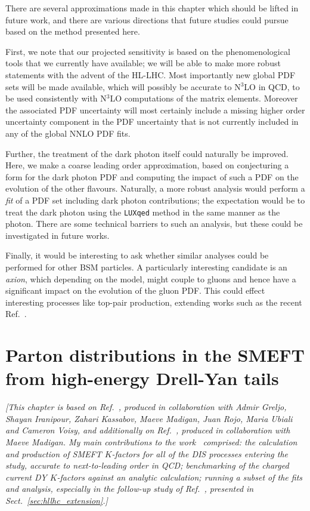 \documentclass[withindex,glossary]{cam-thesis}
\begin{document}
There are several approximations made in this chapter which should be lifted in future work, and there are various directions that future studies could pursue based on the method presented here.

First, we note that our projected sensitivity is based on the phenomenological tools that we currently have available; we will be able to make more robust statements with the advent of the HL-LHC. Most importantly new global PDF sets will be made available, which will possibly be accurate to N$^3$LO in QCD, to be used consistently with N$^3$LO computations of the matrix elements. Moreover the associated PDF uncertainty will most certainly include a missing higher order uncertainty component in the PDF uncertainty that is not currently included in any of the global NNLO PDF fits.

Further, the treatment of the dark photon itself could naturally be improved. Here, we make a coarse leading order approximation, based on conjecturing a form for the dark photon PDF and computing the impact of such a PDF on the evolution of the other flavours. Naturally, a more robust analysis would perform a \textit{fit} of a PDF set including dark photon contributions; the expectation would be to treat the dark photon using the \texttt{LUXqed} method in the same manner as the photon. There are some technical barriers to such an analysis, but these could be investigated in future works.

Finally, it would be interesting to ask whether similar analyses could be performed for other BSM particles. A particularly interesting candidate is an \textit{axion}, which depending on the model, might couple to gluons and hence have a significant impact on the evolution of the gluon PDF. This could effect interesting processes like top-pair production, extending works such as the recent Ref.~\cite{Esser:2023fdo}. 


 


\newpage
\chapter{Parton distributions in the SMEFT from high-energy Drell-Yan tails}
\label{chap:smeftdy}

\noindent \textit{[This chapter is based on Ref.~\cite{greljo_parton_2021}, produced in collaboration with Admir Greljo, Shayan Iranipour, Zahari Kassabov, Maeve Madigan, Juan Rojo, Maria Ubiali and Cameron Voisy, and additionally on Ref.~\cite{Madigan:2021uho}, produced in collaboration with Maeve Madigan. My main contributions to the work~\cite{greljo_parton_2021} comprised: the calculation and production of SMEFT $K$-factors for all of the DIS processes entering the study, accurate to next-to-leading order in QCD; benchmarking of the charged current DY $K$-factors against an analytic calculation; running a subset of the fits and analysis, especially in the follow-up study of Ref.~\cite{Madigan:2021uho}, presented in Sect.~\ref{sec:hllhc_extension}.]}\\
\end{document}
